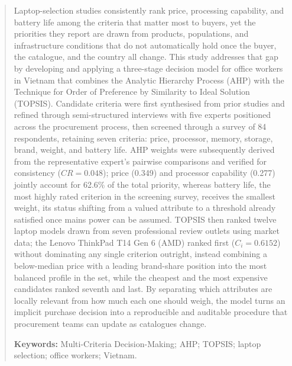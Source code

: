 \begin{abstract}
\noindent
Laptop-selection studies consistently rank price, processing capability, and battery life
among the criteria that matter most to buyers, yet the priorities they report are drawn
from products, populations, and infrastructure conditions that do not automatically hold
once the buyer, the catalogue, and the country all change. This study addresses that gap
by developing and applying a three-stage decision model for office workers in Vietnam that
combines the Analytic Hierarchy Process (AHP) with the Technique for Order of Preference
by Similarity to Ideal Solution (TOPSIS). Candidate criteria were first synthesised from
prior studies and refined through semi-structured interviews with five experts positioned
across the procurement process, then screened through a survey of 84 respondents,
retaining seven criteria: price, processor, memory, storage, brand, weight, and battery
life. AHP weights were subsequently derived from the representative expert's pairwise
comparisons and verified for consistency ($CR = 0.048$); price (0.349) and processor
capability (0.277) jointly account for 62.6\% of the total priority, whereas battery life,
the most highly rated criterion in the screening survey, receives the smallest weight, its
status shifting from a valued attribute to a threshold already satisfied once mains power
can be assumed. TOPSIS then ranked twelve laptop models drawn from seven professional
review outlets using market data; the Lenovo ThinkPad T14 Gen 6 (AMD) ranked first
($C_i = 0.6152$) without dominating any single criterion outright, instead combining a
below-median price with a leading brand-share position into the most balanced profile in
the set, while the cheapest and the most expensive candidates ranked seventh and last. By
separating which attributes are locally relevant from how much each one should weigh, the
model turns an implicit purchase decision into a reproducible and auditable procedure that
procurement teams can update as catalogues change.

\vspace{1em}
\noindent\textbf{Keywords:} Multi-Criteria Decision-Making; AHP; TOPSIS; laptop selection; office workers; Vietnam.
\end{abstract}

\tableofcontents
\listoffigures
\listoftables
